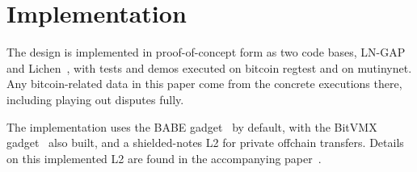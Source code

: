 \documentclass[11pt]{article}
\begin{document}
\section{Implementation}
\label{sec:status}

The design is implemented in proof-of-concept form as two code bases, LN-GAP~\cite{lngapcode} and Lichen~\cite{lichencode}, with tests and demos executed on bitcoin regtest and on mutinynet. Any bitcoin-related data in this paper come from the concrete executions there, including playing out disputes fully.

The implementation uses the BABE gadget~\cite{lichenbuilt} by default, with the BitVMX gadget~\cite{lichenbitvmx} also built, and a shielded-notes L2 for private offchain transfers. Details on this implemented L2 are found in the accompanying paper~\cite{lichenbuilt}.
\end{document}
